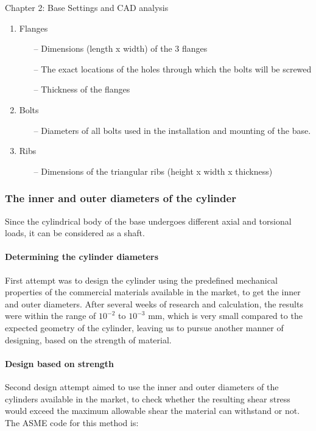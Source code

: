 \documentclass{book}
\begin{document}
\begin{chapter}{Chapter 2: Base Settings and CAD analysis}
\begin{enumerate}
    \item Flanges
    \begin{itemize}
    	\item[--] Dimensions (length x width) of the 3 flanges
    	\item[--] The exact locations of the holes through which the bolts will be screwed
    	\item[--] Thickness of the flanges
    \end{itemize}

    \item Bolts
    \begin{itemize}
    	\item[--] Diameters of all bolts used in the installation and mounting of the base.
    \end{itemize}

    \item Ribs
    \begin{itemize}
    \item[--] Dimensions of the triangular ribs (height x width x thickness)
    \end{itemize}
\end{enumerate}

\vspace{0.5 cm}

\subsubsection{The inner and outer diameters of the cylinder}


Since the cylindrical body of the base undergoes different axial and torsional loads, it can be considered as a shaft.

\paragraph{Determining the cylinder diameters}
First attempt was to design the cylinder using the predefined mechanical properties of the commercial materials available in the market, to get the inner and outer diameters. After several weeks of research and calculation, the results were within the range of $10^{-2}$ to $10^{-3}$ mm, which is very small compared to the expected geometry of the cylinder, leaving us to pursue another manner of designing, based on the strength of material.

\paragraph {Design based on strength}
Second design attempt aimed to use the inner and outer diameters of the cylinders available in the market, to check whether the resulting shear stress would exceed the maximum allowable shear the material can withstand or not. The ASME code for this method is:


\end{chapter}
\end{document}
